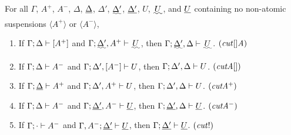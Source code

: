 \documentclass[12pt]{article}
\begin{document}
\begin{theorem}
For all $\Gamma$, $A^+$, $A^-$, $\Delta$, $\uline{\Delta}$,
$\Delta'$, $\uwave{\Delta'}$, $\uline{\Delta'}$, $U$, $\uwave{\,U\,}$,
and $\uline{U}$
containing no non-atomic suspensions $\langle A^+ \rangle$ or
$\langle A^- \rangle$,\medskip
\begin{enumerate}
\item If ${\Gamma};{\Delta} \vdash {[A^+]} \mathstrut$ 
      and $\mildseq{\Gamma}{\uwave{\Delta'},A^+}{\uwave{\,U\,}}$,
      then $\mildseq{\Gamma}{\uwave{\Delta'}, \Delta}{\uwave{\,U\,}}$.
      \quad $(\it cut[]A)$
\item If ${\Gamma};{\Delta} \vdash {A^-} \mathstrut$
      and ${\Gamma};{\Delta', [A^-]} \vdash {U} \mathstrut$,
      then ${\Gamma};{\Delta', \Delta} \vdash {U} \mathstrut$. \medskip
      \quad $(\it cutA[])$
\item If $\mildseq{\Gamma}{\uline{\Delta}}{A^+}$
      and ${\Gamma};{\Delta', A^+} \vdash {U} \mathstrut$,
      then ${\Gamma};{\Delta', \Delta} \vdash {U} \mathstrut$. \medskip
      \quad $(\it cutA^+)$
\item If ${\Gamma};{\Delta} \vdash {A^-} \mathstrut$
      and $\mildseq{\Gamma}{\uline{\Delta'}, A^-}{\uline{U}}$,
      then $\mildseq{\Gamma}{\uline{\Delta'}, \Delta}{\uline{U}}$. \medskip
      \quad $(\it cutA^-)$
\item If ${\Gamma};{\cdot} \vdash {A^-} \mathstrut$
      and $\mildseq{\Gamma, A^-}{\uline{\Delta'}}{\uline{U}}$,
      then $\mildseq{\Gamma}{\uline{\Delta'}}{\uline{U}}$.
      \quad $(\it cut{!})$
\end{enumerate}
\end{theorem}
\end{document}
